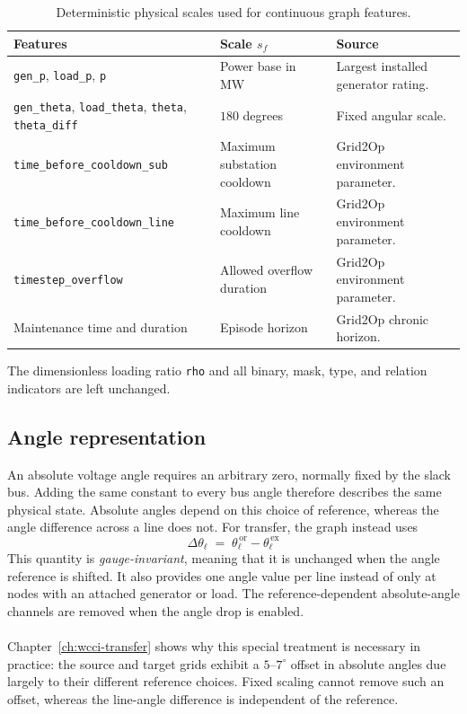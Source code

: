 \begin{table}[H]
  \centering
  \small
  \caption{Deterministic physical scales used for continuous graph features.}
  \label{tab:graph-physical-scales}
  \setlength{\tabcolsep}{5pt}
  \begin{tabular}{L{0.34\textwidth}L{0.25\textwidth}L{0.31\textwidth}}
    \toprule
    Features & Scale $s_f$ & Source \\
    \midrule
    \texttt{gen\_p}, \texttt{load\_p}, \texttt{p}
      & Power base in MW & Largest installed generator rating. \\
    \texttt{gen\_theta}, \texttt{load\_theta}, \texttt{theta}, \texttt{theta\_diff}
      & $180$ degrees & Fixed angular scale. \\
    \texttt{time\_before\_cooldown\_sub}
      & Maximum substation cooldown & Grid2Op environment parameter. \\
    \texttt{time\_before\_cooldown\_line}
      & Maximum line cooldown & Grid2Op environment parameter. \\
    \texttt{timestep\_overflow}
      & Allowed overflow duration & Grid2Op environment parameter. \\
    Maintenance time and duration
      & Episode horizon & Grid2Op chronic horizon. \\
    \bottomrule
  \end{tabular}
\end{table}

\noindent The dimensionless loading ratio \texttt{rho} and all binary, mask, type, and
relation indicators are left unchanged.

\subsection{Angle representation}
\label{sec:line-node-angle}

An absolute voltage angle requires an arbitrary zero, normally fixed by the
slack bus. Adding the same constant to every bus angle therefore describes the
same physical state. Absolute angles depend on this choice of reference, whereas
the angle difference across a line does not. For transfer, the graph instead uses
\[
  \Delta\theta_{\ell} \;=\; \theta^{\,\mathrm{or}}_{\ell} - \theta^{\,\mathrm{ex}}_{\ell}
\]
This quantity
is \emph{gauge-invariant}, meaning that it is unchanged when the angle reference
is shifted. It also provides one angle value per line instead of only at nodes
with an attached generator or load. The reference-dependent absolute-angle
channels are removed when the angle drop is enabled.
\\
\\
Chapter~\ref{ch:wcci-transfer} shows why this special treatment is necessary in
practice: the source and target grids exhibit a $5$--$7^{\circ}$ offset in
absolute angles due largely to their different reference choices. Fixed scaling
cannot remove such an offset, whereas the line-angle difference is independent
of the reference.

